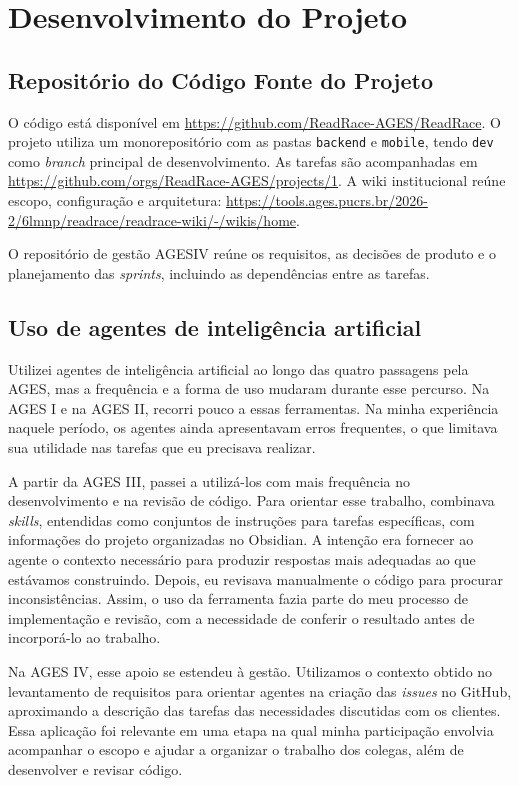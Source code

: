 \section{Desenvolvimento do Projeto}

\subsection{Repositório do Código Fonte do Projeto}

O código está disponível em \url{https://github.com/ReadRace-AGES/ReadRace}. O projeto utiliza um monorepositório com as pastas \texttt{backend} e \texttt{mobile}, tendo \texttt{dev} como \textit{branch} principal de desenvolvimento. As tarefas são acompanhadas em \url{https://github.com/orgs/ReadRace-AGES/projects/1}. A wiki institucional reúne escopo, configuração e arquitetura: \url{https://tools.ages.pucrs.br/2026-2/6lmnp/readrace/readrace-wiki/-/wikis/home}.

O repositório de gestão AGESIV reúne os requisitos, as decisões de produto e o planejamento das \textit{sprints}, incluindo as dependências entre as tarefas.

\subsection{Uso de agentes de inteligência artificial}

Utilizei agentes de inteligência artificial ao longo das quatro passagens pela \ac{AGES}, mas a frequência e a forma de uso mudaram durante esse percurso. Na \ac{AGES} I e na \ac{AGES} II, recorri pouco a essas ferramentas. Na minha experiência naquele período, os agentes ainda apresentavam erros frequentes, o que limitava sua utilidade nas tarefas que eu precisava realizar.

A partir da \ac{AGES} III, passei a utilizá-los com mais frequência no desenvolvimento e na revisão de código. Para orientar esse trabalho, combinava \textit{skills}, entendidas como conjuntos de instruções para tarefas específicas, com informações do projeto organizadas no Obsidian. A intenção era fornecer ao agente o contexto necessário para produzir respostas mais adequadas ao que estávamos construindo. Depois, eu revisava manualmente o código para procurar inconsistências. Assim, o uso da ferramenta fazia parte do meu processo de implementação e revisão, com a necessidade de conferir o resultado antes de incorporá-lo ao trabalho.

Na \ac{AGES} IV, esse apoio se estendeu à gestão. Utilizamos o contexto obtido no levantamento de requisitos para orientar agentes na criação das \textit{issues} no GitHub, aproximando a descrição das tarefas das necessidades discutidas com os clientes. Essa aplicação foi relevante em uma etapa na qual minha participação envolvia acompanhar o escopo e ajudar a organizar o trabalho dos colegas, além de desenvolver e revisar código.

